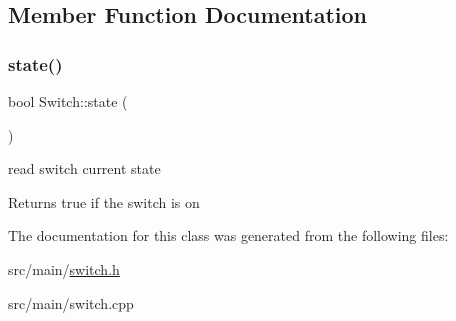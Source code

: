 \subsection{Member Function Documentation}
\mbox{\label{class_switch_ac9b4369bd630f9d975f2bd82933f7cc6}} 
\subsubsection{\texorpdfstring{state()}{state()}}
{\footnotesize\ttfamily bool Switch\+::state (\begin{DoxyParamCaption}{ }\end{DoxyParamCaption})}



read switch current state 

\begin{DoxyReturn}{Returns}
true if the switch is on 
\end{DoxyReturn}


The documentation for this class was generated from the following files\+:\begin{DoxyCompactItemize}
\item 
src/main/\hyperlink{switch_8h}{switch.\+h}\item 
src/main/switch.\+cpp\end{DoxyCompactItemize}
